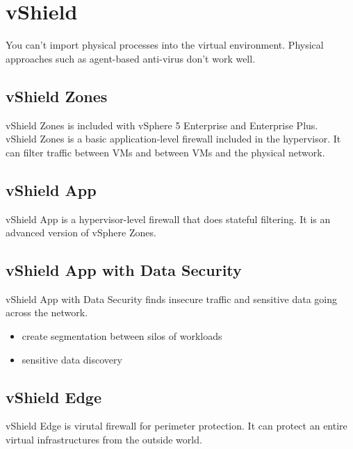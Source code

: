 \section{vShield}

You can't import physical processes into the virtual environment. Physical
approaches such as agent-based anti-virus don't work well.\\

\subsection{vShield Zones}

vShield Zones is included with vSphere 5 Enterprise and Enterprise Plus.\\

vShield Zones is a basic application-level firewall included in the 
hypervisor. It can filter traffic between VMs and between VMs and the physical
network.

\subsection{vShield App}

vShield App is a hypervisor-level firewall that does stateful filtering. It is
an advanced version of vSphere Zones.

\subsection{vShield App with Data Security}

vShield App with Data Security finds insecure traffic and sensitive data
going across the network.

\begin{itemize}

\item create segmentation between silos of workloads
\item sensitive data discovery

\end{itemize}

\subsection{vShield Edge}

vShield Edge is virutal firewall for perimeter protection. It can protect
an entire virtual infrastructures from the outside world.




